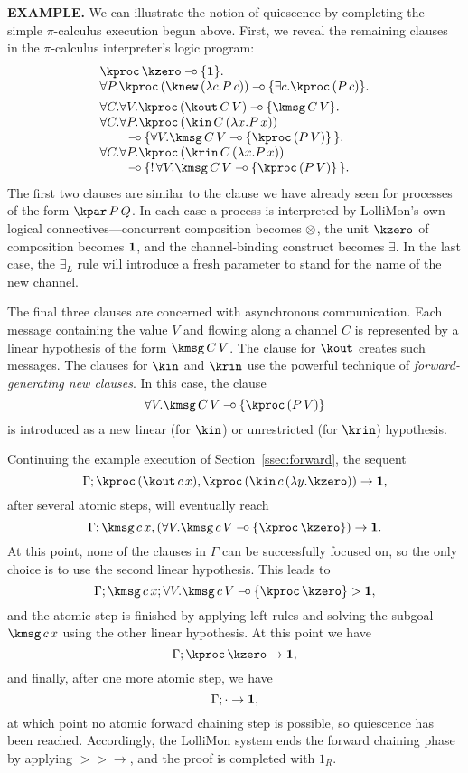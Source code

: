 \documentclass{sig-alt}
\begin{document}
{\bf EXAMPLE.}\enspace
We can illustrate the notion of quiescence by completing the simple
$\pi$-calculus execution begun above. First, we reveal the remaining
clauses in the $\pi$-calculus interpreter's logic program:
$$
\begin{array}{l}
  \kproc\,\kzero \limp \{\one\}. \\
  \forall P.\kproc\,(\knew\,(\lambda c.P\,c)) \limp \{\exists c. \kproc\,(P\,c)\}. \\[1ex]
  \forall C.\forall V.\kproc\,(\kout\,C\,V) \limp \{\kmsg\,C\,V\}. \\
  \forall C.\forall P.\kproc\,(\kin\,C\,(\lambda x.P\,x)) \\
    \qquad{}\limp \{\forall V.\kmsg\,C\,V \limp \{\kproc\,(P\,V)\}\,\}. \\
  \forall C.\forall P.\kproc\,(\krin\,C\,(\lambda x.P\,x)) \\
    \qquad{}\limp \{\bang\forall V.\kmsg\,C\,V \limp \{\kproc\,(P\,V)\}\,\}. \\
\end{array}
$$
The first two clauses are similar to the clause we have already seen
for processes of the form $\kpar\,P\,Q$.  In each case a process is
interpreted by LolliMon's own logical connectives---concurrent composition
becomes $\otimes$, the unit $\kzero$ of composition becomes $\textbf{1}$, and
the channel-binding construct becomes $\exists$.  In the last case,
the $\exists_L$ rule will introduce a fresh parameter to stand
for the name of the new channel.

The final three clauses are concerned with asynchronous communication.
Each message containing the value $V$ and flowing along a channel $C$
is represented by a linear hypothesis of the form $\kmsg\,C\,V$. The
clause for $\kout$ creates such messages.  The clauses for $\kin$ and
$\krin$ use the powerful technique of \emph{forward-generating new
clauses}. In this case, the clause
$$
  \forall V.\kmsg\,C\,V \limp \{\kproc\,(P\,V)\}
$$
is introduced as a new linear (for $\kin$) or unrestricted (for $\krin$)
hypothesis.

Continuing the example execution of Section~\ref{ssec:forward}, the
sequent
$$
  \CLFLseq{\Gamma}{\kproc\,(\kout\,c\,x), \kproc\,(\kin\,c\,(\lambda y.\kzero))}{\one},
$$
after several atomic steps, will eventually reach
$$
  \CLFLseq{\Gamma}{\kmsg\,c\,x, (\forall V.\kmsg\,c\,V \limp \{\kproc\,\kzero\})}{\one}.
$$
%
At this point, none of the clauses in $\Gamma$ can be successfully
focused on, so the only choice is to use the second linear hypothesis.
This leads to
$$
  \CLFLLFseq{\Gamma}{\kmsg\,c\,x}{\forall V.\kmsg\,c\,V \limp \{\kproc\,\kzero\}}{\one},
$$
%
and the atomic step is finished by applying left rules and solving
the subgoal $\kmsg\,c\,x$ using the other linear hypothesis.
At this point we have
$$
  \CLFLseq{\Gamma}{\kproc\,\kzero}{\one},
$$
and finally, after one more atomic step, we have
$$
  \Gamma;\cdot\rightarrow\textbf{1},
$$
at which point no atomic forward chaining step is possible, so quiescence
has been reached. Accordingly, the LolliMon system ends the forward chaining
phase by applying $>\!\! >\rightarrow$, and the proof is completed with $1_R$.
\end{document}
